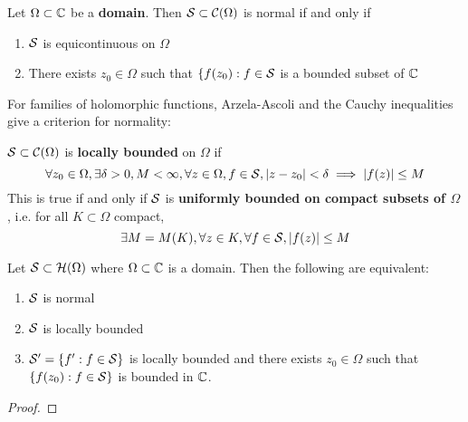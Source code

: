 \documentclass{article}
\begin{document}
\begin{theorem}
Let \(\Omega \subset \mathbb{C}\) be a \textbf{domain}. Then \(\mathcal{S} \subset \mathcal{C}(\Omega)\) is normal if and only if
\begin{enumerate}

  \item \(\mathcal{S}\) is equicontinuous on \(\Omega\)

  \item There exists \(z_0 \in \Omega\) such that \(\{f(z_0) : f \in \mathcal{S}\) is a bounded subset of \(\mathbb{C}\)

\end{enumerate}
\end{theorem}
For families of holomorphic functions, Arzela-Ascoli and the Cauchy inequalities give a criterion for normality:
\begin{definition}
\(\mathcal{S} \subset \mathcal{C}(\Omega)\) is \textbf{locally bounded} on \(\Omega\) if
\begin{equation}\forall z_0 \in \Omega, \exists \delta > 0, M < \infty, \forall z \in \Omega, f \in \mathcal{S}, |z - z_0| < \delta \implies |f(z)| \leq M\end{equation}
This is true if and only if \(\mathcal{S}\) is \textbf{uniformly bounded on compact subsets of \(\Omega\)}, i.e. for all \(K \subset \Omega\) compact,
\begin{equation}\exists M = M(K), \forall z \in K, \forall f \in \mathcal{S}, |f(z)| \leq M\end{equation}
\end{definition}
\begin{theorem}[Montel]
Let \(\mathcal{S} \subset \mathcal{H}(\Omega)\) where \(\Omega \subset \mathbb{C}\) is a domain. Then the following are equivalent:
\begin{enumerate}

  \item \(\mathcal{S}\) is normal

  \item \(\mathcal{S}\) is locally bounded

  \item \(\mathcal{S}' = \{f' : f \in \mathcal{S}\}\) is locally bounded and there exists \(z_0 \in\Omega\) such that \(\{f(z_0) : f \in \mathcal{S}\}\) is bounded in \(\mathbb{C}\).

\end{enumerate}
\end{theorem}
\begin{proof}


\end{proof}
\end{document}
